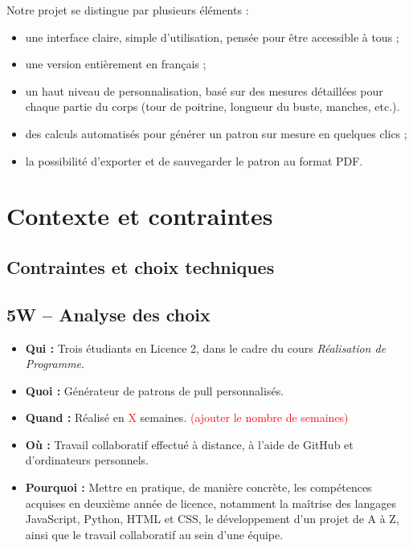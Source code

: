 \documentclass{article}
\begin{document}
	Notre projet se distingue par plusieurs éléments :
	\begin{itemize}
	\item une interface claire, simple d’utilisation, pensée pour être accessible à tous ;
	\item une version entièrement en français ;
	\item un haut niveau de personnalisation, basé sur des mesures détaillées pour chaque partie du corps (tour de poitrine, longueur du buste, manches, etc.).
	\item des calculs automatisés pour générer un patron sur mesure en quelques clics ;
	\item la possibilité d’exporter et de sauvegarder le patron au format PDF.
	\end{itemize}
	
	\section{Contexte et contraintes}
	\subsection{Contraintes et choix techniques}
	

	\subsection*{5W – Analyse des choix}
	\begin{itemize}
		\item \textbf{Qui :} Trois étudiants en Licence 2, dans le cadre du cours \textit{Réalisation de Programme}.
		
		\item \textbf{Quoi :} Générateur de patrons de pull personnalisés.
		
		\item \textbf{Quand :} Réalisé en \textcolor{red}{X} semaines.  \textcolor{red}{(ajouter le nombre de semaines)}
		
		\item \textbf{Où :} Travail collaboratif effectué à distance, à l’aide de GitHub et d’ordinateurs personnels.
		
		\item \textbf{Pourquoi :} Mettre en pratique, de manière concrète, les compétences acquises en deuxième année de licence, notamment la maîtrise des langages JavaScript, Python, HTML et CSS, le développement d’un projet de A à Z, ainsi que le travail collaboratif au sein d’une équipe.
	\end{itemize}
\end{document}
